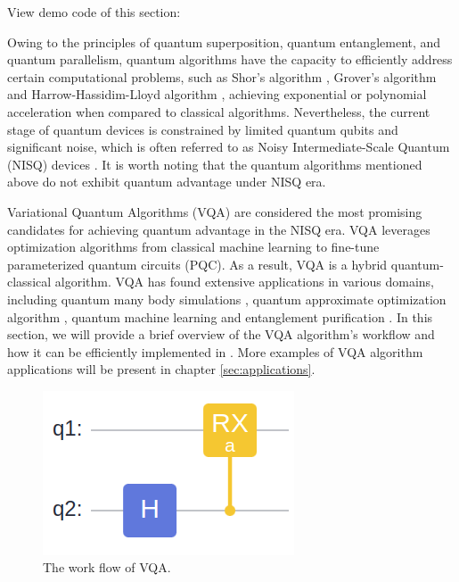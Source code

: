 View demo code of this section: 

Owing to the principles of quantum superposition, quantum entanglement, and quantum parallelism, quantum algorithms have the capacity to efficiently address certain computational problems, such as Shor's algorithm \cite{shor1994algorithms}, Grover's algorithm \cite{grover1996fast,long2001grover} and Harrow-Hassidim-Lloyd algorithm \cite{harrow2009quantum}, achieving exponential or polynomial acceleration when compared to classical algorithms. Nevertheless, the current stage of quantum devices is constrained by limited quantum qubits and significant noise, which is often referred to as Noisy Intermediate-Scale Quantum (NISQ) devices \cite{preskill2018quantum}. It is worth noting that the quantum algorithms mentioned above do not exhibit quantum advantage under NISQ era.

Variational Quantum Algorithms (VQA) \cite{cerezo2021variational,yuan2019theory,xu2021variational} are considered the most promising candidates for achieving quantum advantage in the NISQ era. VQA leverages optimization algorithms from classical machine learning to fine-tune parameterized quantum circuits (PQC). As a result, VQA is a hybrid quantum-classical algorithm. VQA has found extensive applications in various domains, including quantum many body simulations \cite{Peruzzo2014Peruzzo2014,kandala2017hardware,kokail2019self,lyu2023variational,Lyu2023symmetryenhanced,cao2022progress}, quantum approximate optimization algorithm \cite{farhi2014quantum,patti2022variational,chandarana2023digitized}, quantum machine learning \cite{benedetti2019parameterized,wei2022quantum,lloyd2018quantum,biamonte2017quantum,abbas2021power} and entanglement purification \cite{zhang2023variational}. In this section, we will provide a brief overview of the VQA algorithm's workflow and how it can be efficiently implemented in \MindQuantum. More examples of VQA algorithm applications will be present in chapter \ref{sec:applications}.

\begin{figure}[h]
  \begin{center}
    \includegraphics[width=0.9\linewidth]{images/3_1_vqa.png}
  \end{center}
  \caption{The work flow of VQA.}
  \label{fig:vqa_work_flow}
\end{figure}

